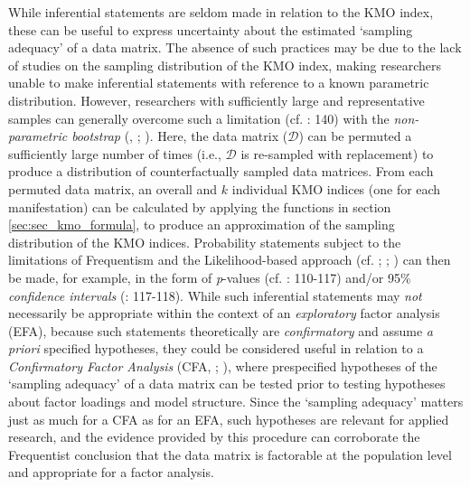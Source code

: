 \documentclass[
  10pt,
  a4paper,
  twoside]{article}
\begin{document}
While inferential statements are seldom made in relation to the KMO index, these can be useful to express uncertainty about the estimated `sampling adequacy' of a data matrix. The absence of such practices may be due to the lack of studies on the sampling distribution of the KMO index, making researchers unable to make inferential statements with reference to a known parametric distribution. However, researchers with sufficiently large and representative samples can generally overcome such a limitation (cf. : 140) with the \emph{non-parametric bootstrap} (, ; ). Here, the data matrix (\(\mathcal{D}\)) can be permuted a sufficiently large number of times (i.e., \(\mathcal{D}\) is re-sampled with replacement) to produce a distribution of counterfactually sampled data matrices. From each permuted data matrix, an overall and \(k\) individual KMO indices (one for each manifestation) can be calculated by applying the functions in section \ref{sec:sec_kmo_formula}, to produce an approximation of the sampling distribution of the KMO indices. Probability statements subject to the limitations of Frequentism and the Likelihood-based approach (cf. ; ; ) can then be made, for example, in the form of \emph{p}-values (cf. : 110-117) and/or 95\% \emph{confidence intervals} (: 117-118). While such inferential statements may \emph{not} necessarily be appropriate within the context of an \emph{exploratory} factor analysis (EFA), because such statements theoretically are \emph{confirmatory} and assume \emph{a priori} specified hypotheses, they could be considered useful in relation to a \emph{Confirmatory Factor Analysis} (CFA, ; ), where prespecified hypotheses of the `sampling adequacy' of a data matrix can be tested prior to testing hypotheses about factor loadings and model structure. Since the `sampling adequacy' matters just as much for a CFA as for an EFA, such hypotheses are relevant for applied research, and the evidence provided by this procedure can corroborate the Frequentist conclusion that the data matrix is factorable at the population level and appropriate for a factor analysis.
\end{document}

